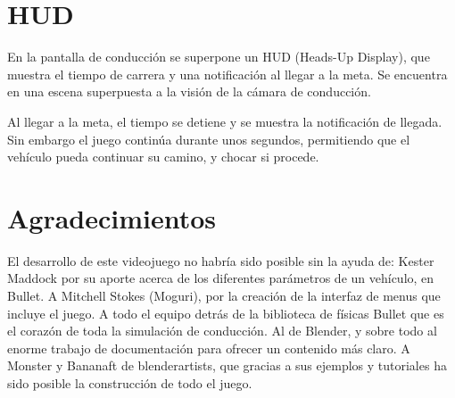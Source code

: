 \documentclass[10pt,a4paper,hidelinks]{article}
\begin{document}
\section{HUD}
En la pantalla de conducción se superpone un HUD (Heads-Up Display), que muestra 
el tiempo de carrera y una notificación al llegar a la meta. Se encuentra en una 
escena superpuesta a la visión de la cámara de conducción.

Al llegar a la meta, el tiempo se detiene y se muestra la notificación de 
llegada. Sin embargo el juego continúa durante unos segundos, permitiendo que el 
vehículo pueda continuar su camino, y chocar si procede.




\section{Agradecimientos}
El desarrollo de este videojuego no habría sido posible sin la ayuda de:
Kester Maddock por su aporte acerca de los diferentes parámetros de un vehículo, 
en Bullet. A Mitchell Stokes (Moguri), por la creación de la interfaz de menus 
que incluye el juego. A todo el equipo detrás de la biblioteca de físicas Bullet 
que es el corazón de toda la simulación de conducción. Al de Blender, y sobre 
todo al enorme trabajo de documentación para ofrecer un contenido más claro. A 
Monster y Bananaft de blenderartists, que gracias a sus ejemplos y tutoriales ha 
sido posible la construcción de todo el juego.
\end{document}
